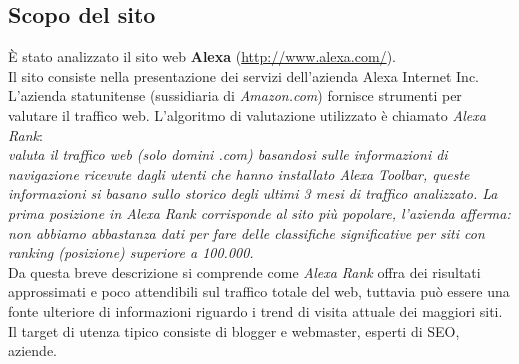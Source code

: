 \subsection{Scopo del sito}\label{scopo}
È stato analizzato il sito web \textbf{Alexa} (\url{http://www.alexa.com/}). \\
Il sito consiste nella presentazione dei servizi dell'azienda Alexa Internet Inc. \\
L'azienda statunitense (sussidiaria di \textit{Amazon.com}) fornisce 
strumenti per valutare il traffico web. L'algoritmo di valutazione utilizzato è chiamato \textit{Alexa Rank}: \\
\textit{valuta il traffico web (solo domini .com) basandosi sulle informazioni di navigazione ricevute dagli utenti che 
hanno installato Alexa Toolbar, queste informazioni si basano sullo 
storico degli ultimi 3 mesi di traffico analizzato.
La prima posizione in Alexa Rank corrisponde al sito più popolare, 
l'azienda afferma: non abbiamo abbastanza dati per fare delle classifiche 
significative per siti con ranking (posizione) superiore a 100.000.} \\
Da questa breve descrizione si comprende come \textit{Alexa Rank} offra dei risultati approssimati e poco attendibili sul traffico totale del web, tuttavia può 
essere una fonte ulteriore di informazioni riguardo i trend di visita attuale dei maggiori siti.\\ 
Il target di utenza tipico consiste di blogger e webmaster, esperti di SEO, 
aziende.
